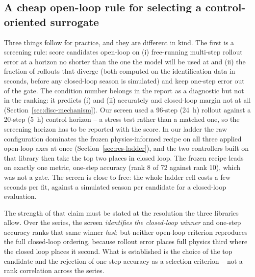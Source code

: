 \subsection{A cheap open-loop rule for selecting a control-oriented surrogate}
\label{sec:disc-rule}

Three things follow for practice, and they are different in kind. The first is a
screening rule: score candidates open-loop on (i) free-running multi-step rollout
error at a horizon no shorter than the one the model will be used at and (ii) the
fraction of rollouts that diverge (both computed on the identification data in seconds, before any closed-loop season is simulated) and keep one-step error out
of the gate. The condition number belongs in the report as a diagnostic but not in
the ranking: it predicts (i) and (ii) accurately and closed-loop margin not at all
(Section~\ref{sec:disc-mechanism}). Our screen used a 96-step (24~h) rollout against a 20-step
(5~h) control horizon -- a stress test rather than a matched one, so the screening
horizon has to be reported with the score. In our ladder the
raw configuration dominates the frozen physics-informed recipe on all three
applied open-loop axes at once (Section~\ref{sec:res-ladder}), and the two
controllers built on that library then take the top two places in closed loop.
The frozen recipe leads on exactly one metric, one-step accuracy (rank 8 of 72
against rank 10), which was not a gate. The screen is close to free: the whole
ladder cell costs a few seconds per fit, against a simulated season per candidate
for a closed-loop evaluation.

The strength of that claim must be stated at the resolution the three libraries
allow. Over the series, the screen \emph{identifies the closed-loop winner} and
one-step accuracy ranks that same winner \emph{last}; but neither open-loop
criterion reproduces the full closed-loop ordering, because rollout error places
full physics third where the closed loop places it second. What is established is
the choice of the top candidate and the rejection of one-step accuracy as a
selection criterion -- not a rank correlation across the series.

